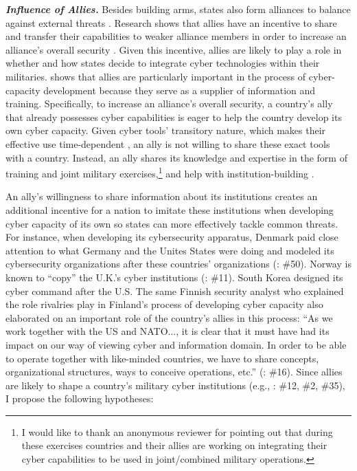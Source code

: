 \documentclass[12pt, letterpaper]{article}
\renewcommand{\baselinestretch}{1.35}
\let\oldfootnote\footnote
\renewcommand\footnote[1]{\oldfootnote{%
		\renewcommand\baselinestretch{.8}%
		\large\footnotesize\ignorespaces#1}} \addtolength{\footnotesep}{3pt}
\theoremstyle{plain}
\theoremstyle{remark}
\begin{document}
\vspace{3mm}



\noindent
\textit{\textbf{Influence of Allies.}}
Besides building arms, states also form alliances to balance against external threats \citep{waltz1979theory}.
Research shows that allies have an incentive to share and transfer their capabilities to weaker alliance members in order to increase an alliance’s overall security \citep{Yarhi2016IS}. 
Given this incentive, allies are likely to play a role in whether and how states decide to integrate cyber technologies within their militaries.
\citet{Kostyuk2024JPR} shows that allies are particularly important in the process of cyber-capacity development because they serve as a supplier of information and training. Specifically, to increase an alliance’s overall security, a country’s ally that already possesses cyber capabilities is eager to help the country develop its own cyber capacity.  
Given cyber tools’ transitory nature, which makes their effective use time-dependent \citep{Buchanan2020TNSR}, an ally is not willing to share these exact tools with a country. Instead, an ally shares its knowledge and expertise in the form of training and joint military exercises,\footnote{
	I would like to thank an anonymous reviewer for pointing out that during these exercises countries and their allies are working on integrating their cyber capabilities to be used in joint/combined military operations. 	
	} 
and help with institution-building \citep{Smeets2022SS}.


An ally's willingness to share information about its institutions creates an additional incentive for a nation to imitate these institutions when developing cyber capacity of its own so states can more effectively tackle common threats.
For instance, when developing its cybersecurity apparatus, Denmark paid close attention to what Germany and the Unites States were doing and modeled its cybersecurity organizations after these countries' organizations (\citealt{interviews2019}: \#50). Norway is known to ``copy'' the U.K.'s cyber institutions (\citealt{interviews2019}: \#11).
South Korea designed its cyber command after the U.S. 
The same Finnish security analyst who explained the role rivalries play in Finland's process of developing cyber capacity also elaborated on an important role of the country's allies in this process: ``As we work together with the US and NATO..., 
it is clear that it must have had its impact on our way of viewing cyber and information domain. 
In order to be able to operate together with like-minded countries, we have to share concepts, organizational structures, ways to conceive operations, etc.''
(\citealp{interviews2019}: \#16).
Since allies are likely to shape a country's military cyber institutions (e.g., %
 \citealt{interviews2019}: \#12, \#2, \#35), I propose the following hypotheses:
\end{document}
